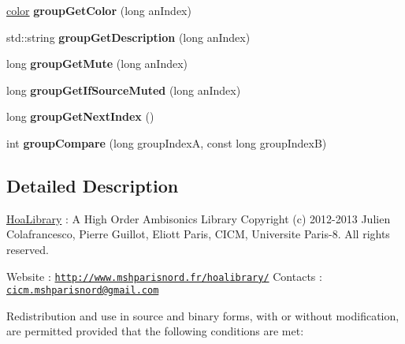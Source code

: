 \begin{DoxyCompactItemize}
\item 
\hypertarget{class_sources_manager_a6c88c37f8e44d170caf46d207bbc48fb}{\hyperlink{structcolor}{color} {\bfseries group\-Get\-Color} (long an\-Index)}\label{class_sources_manager_a6c88c37f8e44d170caf46d207bbc48fb}

\item 
\hypertarget{class_sources_manager_a9be48f955fb2216876279f948caf88f0}{std\-::string {\bfseries group\-Get\-Description} (long an\-Index)}\label{class_sources_manager_a9be48f955fb2216876279f948caf88f0}

\item 
\hypertarget{class_sources_manager_aeb2ac0aaca7d404d234e99c8edd1353f}{long {\bfseries group\-Get\-Mute} (long an\-Index)}\label{class_sources_manager_aeb2ac0aaca7d404d234e99c8edd1353f}

\item 
\hypertarget{class_sources_manager_a639bb7994e1a7b581941c6e422af6280}{long {\bfseries group\-Get\-If\-Source\-Muted} (long an\-Index)}\label{class_sources_manager_a639bb7994e1a7b581941c6e422af6280}

\item 
\hypertarget{class_sources_manager_a302176eba9e00d95b4229ab5136f6d4a}{long {\bfseries group\-Get\-Next\-Index} ()}\label{class_sources_manager_a302176eba9e00d95b4229ab5136f6d4a}

\item 
\hypertarget{class_sources_manager_a0f2c869920ae6ef67b629b0d041ac2d1}{int {\bfseries group\-Compare} (long group\-Index\-A, const long group\-Index\-B)}\label{class_sources_manager_a0f2c869920ae6ef67b629b0d041ac2d1}

\end{DoxyCompactItemize}


\subsection{Detailed Description}
\hyperlink{interface_hoa_library}{Hoa\-Library} \-: A High Order Ambisonics Library Copyright (c) 2012-\/2013 Julien Colafrancesco, Pierre Guillot, Eliott Paris, C\-I\-C\-M, Universite Paris-\/8. All rights reserved.

Website \-: \href{http://www.mshparisnord.fr/hoalibrary/}{\tt http\-://www.\-mshparisnord.\-fr/hoalibrary/} Contacts \-: \href{mailto:cicm.mshparisnord@gmail.com}{\tt cicm.\-mshparisnord@gmail.\-com}

Redistribution and use in source and binary forms, with or without modification, are permitted provided that the following conditions are met\-:


